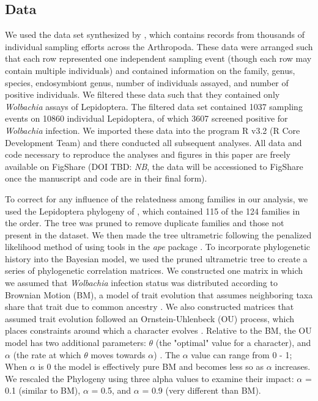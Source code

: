 \documentclass{frontiersSCNS}
\begin{document}
\subsection{Data}
We used the data set synthesized by \citet{Weinert:2015aa}, which contains records from thousands of individual sampling efforts across the Arthropoda.  These data were arranged such that each row represented one independent sampling event (though each row may contain multiple individuals) and contained information on the family, genus, species, endosymbiont genus, number of individuals assayed, and number of positive individuals. We filtered these data such that they contained only \textit{Wolbachia} assays of Lepidoptera. The filtered data set contained 1037 sampling events on 10860 individual Lepidoptera, of which 3607 screened positive for \textit{Wolbachia} infection. We imported these data into the program R v3.2 (R Core Development Team) and there conducted all subsequent analyses. All data and code necessary to reproduce the analyses and figures in this paper are freely available on FigShare (DOI TBD: \textit{NB}, the data will be accessioned to FigShare once the manuscript and code are in their final form).

To correct for any influence of the relatedness among families in our analysis, we used the Lepidoptera phylogeny of \citet{Regier:2013fp}, which contained 115 of the 124 families in the order. The tree was pruned to remove duplicate families and those not present in the  \cite{Weinert:2015aa} dataset. We then made the tree ultrametric following the penalized likelihood method of \citet{Sanderson:2002vy} using tools in the \textit{ape} package \citep{Paradis:2004dv}. To incorporate phylogenetic history into the Bayesian model, we used the pruned ultrametric tree to create a series of phylogenetic correlation matrices. We constructed one matrix in which we assumed that \textit{Wolbachia} infection status was distributed according to Brownian Motion (BM), a model of trait evolution that assumes neighboring taxa share that trait due to common ancestry \citep{Paradis:2012wn}. We also constructed matrices that assumed trait evolution followed an Ornstein-Uhlenbeck (OU) process, which places constraints around which a character evolves \citep{Paradis:2012wn}. Relative to the BM, the OU model has two additional parameters: $\theta$ (the "optimal" value for a character), and $\alpha$ (the rate at which $\theta$ moves towards $\alpha$) \citep{Paradis:2012wn}. The $\alpha$ value can range from 0 - 1; When $\alpha$ is 0 the model is effectively pure BM and becomes less so as $\alpha$ increases. We rescaled the Phylogeny using three alpha values to examine their impact: $\alpha$ = 0.1 (similar to BM), $\alpha$ = 0.5, and $\alpha$ = 0.9 (very different than BM).
\end{document}
